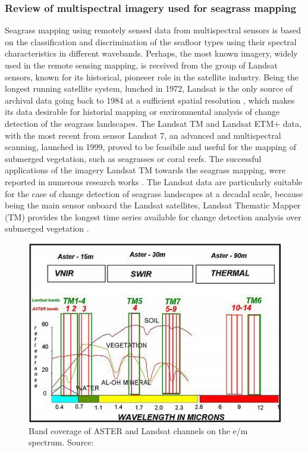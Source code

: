 \documentclass[10pt, a4paper]{article}
\begin{document}
\subsubsection{Review of multispectral imagery used for seagrass mapping}
Seagrass mapping using remotely sensed data from multispectral sensors is based on the classification
and discrimination of the seafloor types using their spectral characteristics in different wavebands.
Perhaps, the most known imagery, widely used in the remote sensing mapping, is received from the
group of Landsat sensors, known for its historical, pioneeer role in the satellite industry.
Being the longest running satellite system, lunched in 1972, Landsat is the only source of archival
data going back to 1984 at a sufficient spatial resolution \cite{Dekker05}\label{Dekker05}, which makes its data
desirable for historial mapping or environmental analysis of change detection of the seagrass
landscapes.
The Landsat TM and Landsat ETM+ data, with the most recent from sensor Landsat 7, an advanced
and multispectral scanning, launched in 1999, proved to be feasibile and useful for the mapping of
submerged vegetation, such as seagrasses or coral reefs. The successful applications of the imagery
Landsat TM towards the seagrass mapping, were reported in numerous research works \cite{Palandro03,Gullstroom06,Wabnitz08,Bierwirth93,Ferguson97,Rasib97}\label{Palandro03} \label{Gullstroom06} \label{Wabnitz08} \label{Bierwirth93} \label{Ferguson97} \label{Rasib97}. The Landsat data are particularly suitable for the
case of change detection of seagrass landscapes at a decadal scale, because being the main sensor
onboard the Landsat satellites, Landsat Thematic Mapper (TM) provides the longest time series
available for change detection analysis over submerged vegetation \cite{Palandro03}\label{Palandro03}.

\begin{figure}
\centering
\includegraphics[scale=0.35]{Fig-13.jpg}
\caption{Band coverage of ASTER and Landsat channels on
the e/m spectrum. Source:\cite{Kalinowski04}\label{Kalinowski04}}
\label{fig:13}
\end{figure}
\end{document}
